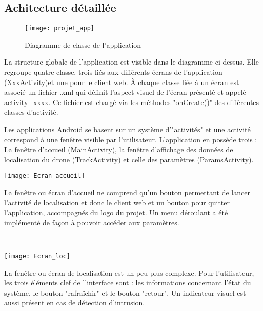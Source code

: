 \subsection{Achitecture détaillée}


\begin{figure}[h]
  \centering
  \texttt{[image: projet\_app]}
  \caption{Diagramme de classe de l'application}
  \label{fig:down}
\end{figure}

	La structure globale de l'application est visible dans le diagramme ci-dessus. Elle regroupe quatre classe, trois liés aux différents écrans de l'application (XxxActivity)et une pour le client web. À chaque classe liée à un écran est associé un fichier .xml qui définit l'aspect visuel de l'écran présenté et appelé activity\_xxxx. Ce fichier est chargé via les méthodes "onCreate()" des différentes classes d'activité.

	Les applications Android se basent sur un système d'"activités" et une activité correspond à une fenêtre visible par l'utilisateur. L'application en possède trois : La fenêtre d'accueil (MainActivity), la fenêtre d'affichage des données de localisation du drone (TrackActivity) et celle des paramètres (ParamsActivity).
	
	\begin{minipage}{0.35\linewidth}
 		\centering
  		\texttt{[image: Ecran\_accueil]}
	\end{minipage}
	\begin{minipage}{0.45\linewidth}

	La fenêtre ou écran d'accueil ne comprend qu'un bouton permettant de lancer l'activité de localisation et donc le client web et un bouton pour quitter l'application, accompagnés du logo du projet. Un menu déroulant a été implémenté de façon à pouvoir accéder aux paramètres.
	\end{minipage}
	~\\	
	
	\begin{minipage}{0.35\linewidth}
 		\centering
 	 \texttt{[image: Ecran\_loc]}
	\end{minipage}
	\begin{minipage}{0.45\linewidth}
	 La fenêtre ou écran de localisation est un peu plus complexe. Pour l'utilisateur, les trois éléments clef de l'interface sont : les informations concernant l'état du système, le bouton "rafraîchir" et le bouton "retour". Un indicateur visuel est aussi présent en cas de détection d'intrusion.
	\end{minipage}
	~\\
	
